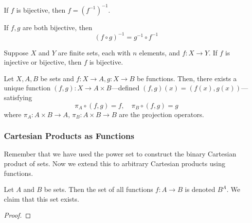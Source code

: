   \begin{theorem}
    \label{thm:inverse-of-inverses}
    If $f$ is bijective, then $f = (f^{-1})^{-1}$. 
  \end{theorem}

  \begin{theorem}
    \label{thm:inverse-of-compositions}
    If $f, g$ are both bijective, then 
    \begin{equation}
      (f \circ g)^{-1} = g^{-1} \circ f^{-1}
    \end{equation}
  \end{theorem}

  \begin{theorem}
    \label{thm:finite-set-mappings}
    Suppose $X$ and $Y$ are finite sets, each with $n$ elements, and $f: X \rightarrow Y$. If $f$ is injective or bijective, then $f$ is bijective. 
  \end{theorem} 

	\begin{theorem}
		\label{thm:universal_cartesian}
		Let $X, A, B$ be sets and $f: X \to A, g: X \to B$ be functions. Then, there exists a unique function $(f, g): X \to A \times B$---defined $(f, g)(x) = (f(x), g(x))$---satisfying 
		\begin{equation}
		  \pi_A \circ (f, g) = f, \quad \pi_B \circ (f, g) = g
		\end{equation}
		where $\pi_A: A \times B \to A$, $\pi_B: A \times B \to B$ are the projection operators. 
	\end{theorem}

\subsubsection{Cartesian Products as Functions} 

  Remember that we have used the power set to construct the binary Cartesian product of sets. Now we extend this to arbitrary Cartesian products using functions. 

  \begin{lemma}
    \label{thm:the-set-of-functions-ba}
 
    Let $A$ and $B$ be sets. Then the set of all functions $f: A \rightarrow B$ is denoted $B^A$. We claim that this set exists. 
  \end{lemma}
  \begin{proof}
    
  \end{proof}

